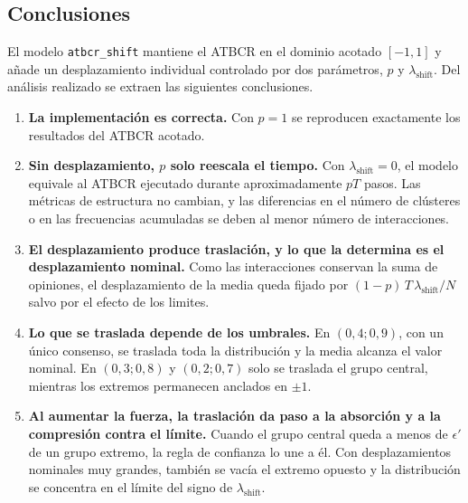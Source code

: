 \documentclass[11pt,a4paper]{article}
\begin{document}
\subsection{Conclusiones}
\label{sec:shift-conclusiones}

El modelo \texttt{atbcr\_shift} mantiene el ATBCR en el dominio acotado $[-1,1]$ y añade un desplazamiento individual controlado por dos parámetros, $p$ y $\lambda_{\mathrm{shift}}$. Del análisis realizado se extraen las siguientes conclusiones.

\begin{enumerate}
    \item \textbf{La implementación es correcta.} Con $p=1$ se reproducen exactamente los resultados del ATBCR acotado.

    \item \textbf{Sin desplazamiento, $p$ solo reescala el tiempo.} Con $\lambda_{\mathrm{shift}}=0$, el modelo equivale al ATBCR ejecutado durante aproximadamente $pT$ pasos. Las métricas de estructura no cambian, y las diferencias en el número de clústeres o en las frecuencias acumuladas se deben al menor número de interacciones.

    \item \textbf{El desplazamiento produce traslación, y lo que la determina es el desplazamiento nominal.} Como las interacciones conservan la suma de opiniones, el desplazamiento de la media queda fijado por $(1-p)\,T\,\lambda_{\mathrm{shift}}/N$ salvo por el efecto de los limites.

    \item \textbf{Lo que se traslada depende de los umbrales.} En $(0{,}4;0{,}9)$, con un único consenso, se traslada toda la distribución y la media alcanza el valor nominal. En $(0{,}3;0{,}8)$ y $(0{,}2;0{,}7)$ solo se traslada el grupo central, mientras los extremos permanecen anclados en $\pm1$.

    \item \textbf{Al aumentar la fuerza, la traslación da paso a la absorción y a la compresión contra el límite.} Cuando el grupo central queda a menos de $\epsilon'$ de un grupo extremo, la regla de confianza lo une a él. Con desplazamientos nominales muy grandes, también se vacía el extremo opuesto y la distribución se concentra en el límite del signo de $\lambda_{\mathrm{shift}}$.


\end{enumerate}
\end{document}
